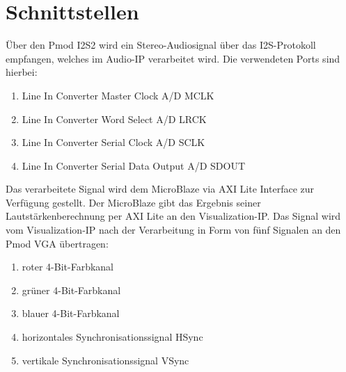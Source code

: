 \section{Schnittstellen}

Über den Pmod I2S2 wird ein Stereo-Audiosignal über das I2S-Protokoll empfangen, welches im Audio-IP verarbeitet wird.
Die verwendeten Ports sind hierbei:
\begin{enumerate}
    \item Line In Converter Master Clock \glqq A/D MCLK\grqq
    \item Line In Converter Word Select \glqq A/D LRCK\grqq
    \item Line In Converter Serial Clock \glqq A/D SCLK\grqq
    \item Line In Converter Serial Data Output \glqq A/D SDOUT\grqq
\end{enumerate}
Das verarbeitete Signal wird dem MicroBlaze via AXI Lite Interface zur Verfügung gestellt.
Der MicroBlaze gibt das Ergebnis seiner Lautstärkenberechnung per AXI Lite an den Visualization-IP.
Das Signal wird vom Visualization-IP nach der Verarbeitung in Form von fünf Signalen an den Pmod VGA übertragen:
\begin{enumerate}
    \item roter 4-Bit-Farbkanal
    \item grüner 4-Bit-Farbkanal
    \item blauer 4-Bit-Farbkanal
    \item horizontales Synchronisationssignal \glqq HSync\grqq
    \item vertikale Synchronisationssignal \glqq VSync\grqq
\end{enumerate}